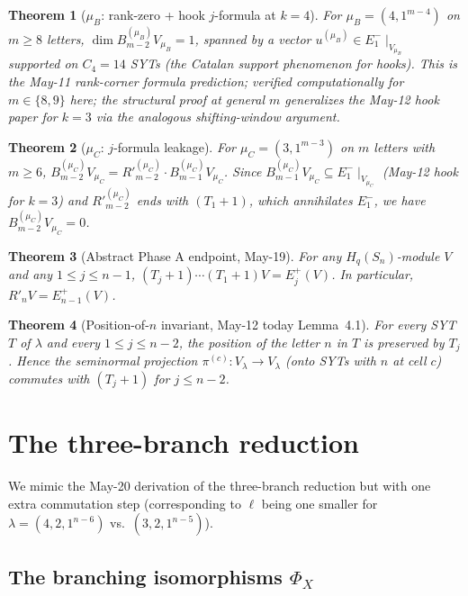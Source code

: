 \documentclass[11pt]{article}
\newtheorem{theorem}{Theorem}
\theoremstyle{definition}
\begin{document}
\begin{theorem}[$\mu_B$: rank-zero + hook $j$-formula at $k = 4$]\label{thm:muB}
For $\mu_B = (4, 1^{m-4})$ on $m \ge 8$ letters,
$\dim B_{m-2}^{(\mu_B)} V_{\mu_B} = 1$, spanned by a vector
$u^{(\mu_B)} \in E_1^-\!\mid_{V_{\mu_B}}$ supported on
$C_4 = 14$ SYTs (the Catalan support phenomenon for hooks).
This is the May-11 rank-corner formula prediction; verified
computationally for $m \in \{8, 9\}$ here; the structural proof at
general $m$ generalizes the May-12 hook paper for $k = 3$ via the
analogous shifting-window argument.
\end{theorem}

\begin{theorem}[$\mu_C$: $j$-formula leakage]\label{thm:muC}
For $\mu_C = (3, 1^{m-3})$ on $m$ letters with $m \ge 6$,
$B_{m-2}^{(\mu_C)} V_{\mu_C} = R'^{(\mu_C)}_{m-2} \cdot
B_{m-1}^{(\mu_C)} V_{\mu_C}$. Since $B_{m-1}^{(\mu_C)} V_{\mu_C}
\subseteq E_1^-\!\mid_{V_{\mu_C}}$ (May-12 hook for $k=3$) and
$R'^{(\mu_C)}_{m-2}$ ends with $(T_1{+}1)$, which annihilates
$E_1^-$, we have $B_{m-2}^{(\mu_C)} V_{\mu_C} = 0$.
\end{theorem}

\begin{theorem}[Abstract Phase A endpoint, May-19]\label{thm:phaseA}
For any $H_q(S_n)$-module $V$ and any $1 \le j \le n-1$,
$(T_j+1)\cdots(T_1+1) V = E_j^+(V)$. In particular, $R'_n V =
E_{n-1}^+(V)$.
\end{theorem}

\begin{theorem}[Position-of-$n$ invariant, May-12 today Lemma~4.1]
\label{thm:posn}
For every SYT $T$ of $\lambda$ and every $1 \le j \le n-2$, the
position of the letter $n$ in $T$ is preserved by $T_j$. Hence
the seminormal projection $\pi^{(c)}: V_\lambda \to V_\lambda$
(onto SYTs with $n$ at cell $c$) commutes with $(T_j{+}1)$ for
$j \le n-2$.
\end{theorem}

\section{The three-branch reduction}\label{sec:reduction}

We mimic the May-20 derivation of the three-branch reduction but
with one extra commutation step (corresponding to $\ell$ being one
smaller for $\lambda = (4, 2, 1^{n-6})$ vs.\ $(3, 2, 1^{n-5})$).

\subsection{The branching isomorphisms $\Phi_X$}
\end{document}
